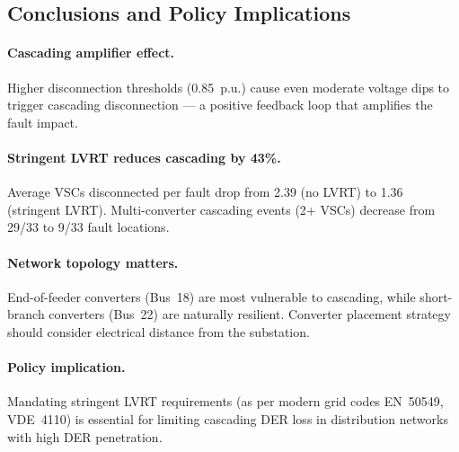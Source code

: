 \subsection{Conclusions and Policy Implications}
\label{sec:conclusions}

\paragraph{Cascading amplifier effect.}
Higher disconnection thresholds (0.85~p.u.) cause even moderate voltage dips to trigger cascading disconnection --- a positive feedback loop that amplifies the fault impact.

\paragraph{Stringent LVRT reduces cascading by 43\%.}
Average VSCs disconnected per fault drop from 2.39 (no LVRT) to 1.36 (stringent LVRT). Multi-converter cascading events (2+ VSCs) decrease from 29/33 to 9/33 fault locations.

\paragraph{Network topology matters.}
End-of-feeder converters (Bus~18) are most vulnerable to cascading, while short-branch converters (Bus~22) are naturally resilient. Converter placement strategy should consider electrical distance from the substation.

\paragraph{Policy implication.}
Mandating stringent LVRT requirements (as per modern grid codes EN~50549, VDE~4110) is essential for limiting cascading DER loss in distribution networks with high DER penetration.
